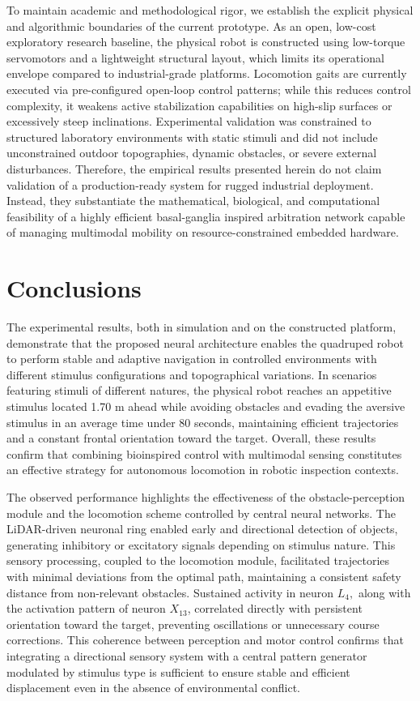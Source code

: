 \documentclass[preprint,12pt]{elsarticle}
\begin{document}
To maintain academic and methodological rigor, we establish the explicit physical and algorithmic boundaries of the current prototype. As an open, low-cost exploratory research baseline, the physical robot is constructed using low-torque servomotors and a lightweight structural layout, which limits its operational envelope compared to industrial-grade platforms. Locomotion gaits are currently executed via pre-configured open-loop control patterns; while this reduces control complexity, it weakens active stabilization capabilities on high-slip surfaces or excessively steep inclinations. Experimental validation was constrained to structured laboratory environments with static stimuli and did not include unconstrained outdoor topographies, dynamic obstacles, or severe external disturbances. Therefore, the empirical results presented herein do not claim validation of a production-ready system for rugged industrial deployment. Instead, they substantiate the mathematical, biological, and computational feasibility of a highly efficient basal-ganglia inspired arbitration network capable of managing multimodal mobility on resource-constrained embedded hardware.

\section{Conclusions}

The experimental results, both in simulation and on the constructed platform, demonstrate that the proposed neural architecture enables the quadruped robot to perform stable and adaptive navigation in controlled environments with different stimulus configurations and topographical variations. In scenarios featuring stimuli of different natures, the physical robot reaches an appetitive stimulus located 1.70 m ahead while avoiding obstacles and evading the aversive stimulus in an average time under 80 seconds, maintaining efficient trajectories and a constant frontal orientation toward the target. Overall, these results confirm that combining bioinspired control with multimodal sensing constitutes an effective strategy for autonomous locomotion in robotic inspection contexts. 

The observed performance highlights the effectiveness of the obstacle-perception module and the locomotion scheme controlled by central neural networks. The LiDAR-driven neuronal ring enabled early and directional detection of objects, generating inhibitory or excitatory signals depending on stimulus nature. This sensory processing, coupled to the locomotion module, facilitated trajectories with minimal deviations from the optimal path, maintaining a consistent safety distance from non-relevant obstacles. Sustained activity in neuron $L_4,$ along with the activation pattern of neuron $X_{13}$, correlated directly with persistent orientation toward the target, preventing oscillations or unnecessary course corrections. This coherence between perception and motor control confirms that integrating a directional sensory system with a central pattern generator modulated by stimulus type is sufficient to ensure stable and efficient displacement even in the absence of environmental conflict. 
\end{document}
